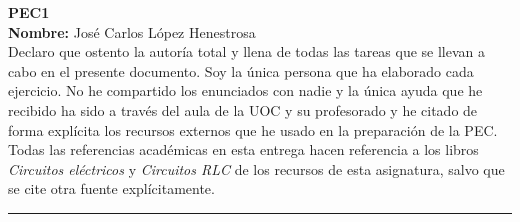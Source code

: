 \documentclass[11pt, a4paper]{article}
\begin{document}
	\begin{center}
		\Large{ \textbf{PEC1} } \\
		\vspace{0.5cm}
		\normalsize{\textbf{Nombre:} José Carlos López Henestrosa} \\
		\vspace{0.5cm}
		\normalsize{Declaro que ostento la autoría total y llena de todas las tareas que se llevan a cabo en el presente documento. Soy la única persona que ha elaborado cada ejercicio. No he compartido los enunciados con nadie y la única ayuda que he recibido ha sido a través del aula de la UOC y su profesorado y he citado de forma explícita los recursos externos que he usado en la preparación de la PEC.} \\
		\vspace{0.5cm}
		\normalsize{Todas las referencias académicas en esta entrega hacen referencia a los libros \textit{Circuitos eléctricos} y \textit{Circuitos RLC} de los recursos de esta asignatura, salvo que se cite otra fuente explícitamente.}
	\end{center}

	\vspace{1cm}
	\hrule
	\vspace{1cm}
\end{document}
